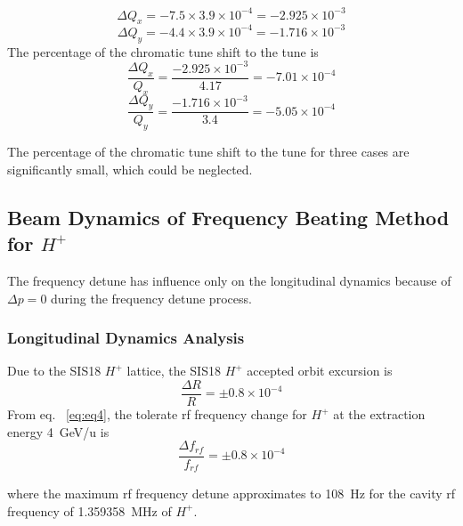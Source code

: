 \begin{equation}
\Delta Q_x = -7.5\times 3.9\times 10^{-4}=-2.925 \times 10^{-3}
\end{equation}
\begin{equation}
\Delta Q_y = -4.4\times 3.9\times 10^{-4}=-1.716\times 10^{-3} 
\end{equation}
The percentage of the chromatic tune shift to the tune is
\begin{equation}
\frac{\Delta Q_x}{Q_x} = \frac{-2.925 \times 10^{-3}}{4.17}=-7.01 \times 10^{-4}
\end{equation}
\begin{equation}
\frac{\Delta Q_y}{Q_y} = \frac{-1.716\times 10^{-3}}{3.4} =-5.05 \times 10^{-4}
\end{equation}

The percentage of the chromatic tune shift to the tune for three cases are significantly small, which could be neglected.

\subsection{Beam Dynamics of Frequency Beating Method for $H^+$} 
The frequency detune has influence only on the longitudinal dynamics because of $\Delta p = 0$ during the frequency detune process.

\subsubsection{Longitudinal Dynamics Analysis}
Due to the SIS18 $H^+$ lattice, the SIS18 $H^+$ accepted orbit excursion is~\cite{liebermann_fair_2013}
\begin{equation}
\frac{\Delta{R}}{R} = \pm 0.8 \times 10^{-4}
\end{equation}
From eq. ~\ref{eq:eq4}, the tolerate rf frequency change for $H^+$ at the extraction energy \SI{4}{GeV/u} is
\begin{equation}
\frac{\Delta{f}_\mathit{rf}}{f_\mathit{rf}} = \pm 0.8 \times 10^{-4}
\end{equation}


where the maximum rf frequency detune approximates to \SI{108}{Hz} for the cavity rf frequency of \SI{1.359358}{MHz} of $H^+$.
